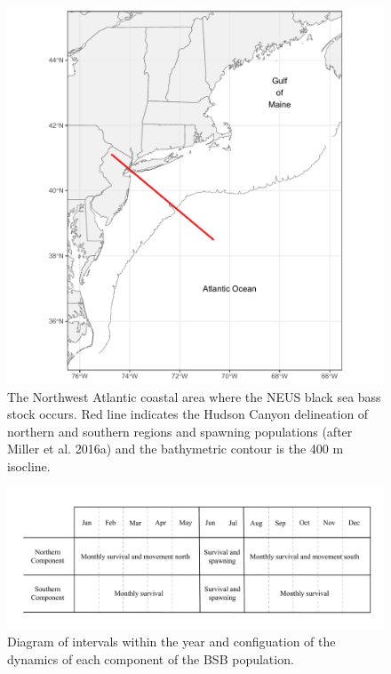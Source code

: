 \documentclass[
]{article}
\begin{document}
\begin{figure}

{\centering \includegraphics[width=1\linewidth]{map} 

}

\caption{The Northwest Atlantic coastal area where the NEUS black sea bass stock occurs. Red line indicates the Hudson Canyon delineation of northern and southern regions and spawning populations (after Miller et al. 2016a) and the bathymetric contour is the 400 m isocline.}\label{fig:map}
\end{figure}
\pagebreak

\begin{figure}

{\centering \includegraphics[width=0.8\linewidth]{bsb_movement_diagram} 

}

\caption{Diagram of intervals within the year and configuation of the dynamics of each component of the BSB population.}\label{fig:migration-diagram}
\end{figure}
\pagebreak
\end{document}
